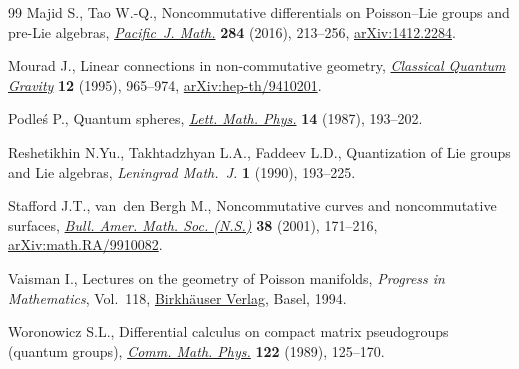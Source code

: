 \begin{thebibliography}{99}
Majid S., Tao W.-Q., Noncommutative differentials on {P}oisson--{L}ie groups and
 pre-{L}ie algebras, \href{https://doi.org/10.2140/pjm.2016.284.213}{\textit{Pacific~J. Math.}} \textbf{284} (2016), 213--256,
 \href{https://arxiv.org/abs/1412.2284}{arXiv:1412.2284}.

Mourad J., Linear connections in non-commutative geometry, \href{https://doi.org/10.1088/0264-9381/12/4/007}{\textit{Classical
 Quantum Gravity}} \textbf{12} (1995), 965--974, \href{https://arxiv.org/abs/hep-th/9410201}{arXiv:hep-th/9410201}.

Podle\'s P., Quantum spheres, \href{https://doi.org/10.1007/BF00416848}{\textit{Lett. Math. Phys.}} \textbf{14} (1987),
 193--202.

Reshetikhin N.Yu., Takhtadzhyan L.A., Faddeev L.D., Quantization of {L}ie groups
 and {L}ie algebras, \textit{Leningrad Math.~J.} \textbf{1} (1990), 193--225.

Stafford J.T., van~den Bergh M., Noncommutative curves and noncommutative
 surfaces, \href{https://doi.org/10.1090/S0273-0979-01-00894-1}{\textit{Bull. Amer. Math. Soc. (N.S.)}} \textbf{38} (2001),
 171--216, \href{https://arxiv.org/abs/math.RA/9910082}{arXiv:math.RA/9910082}.

Vaisman I., Lectures on the geometry of {P}oisson manifolds, \textit{Progress
 in Mathematics}, Vol.~118, \href{https://doi.org/10.1007/978-3-0348-8495-2}{Birkh\"auser Verlag}, Basel, 1994.

Woronowicz S.L., Differential calculus on compact matrix pseudogroups (quantum
 groups), \href{https://doi.org/10.1007/BF01221411}{\textit{Comm. Math. Phys.}} \textbf{122} (1989), 125--170.

\end{thebibliography}
